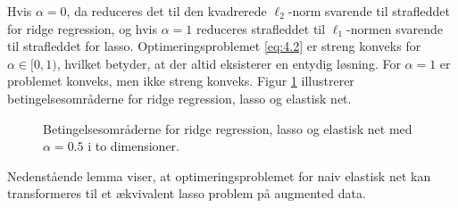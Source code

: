 Hvis $\alpha=0$, da reduceres det til den kvadrerede $\ell_2$-norm svarende til strafleddet for ridge regression, og hvis $\alpha=1$ reduceres strafleddet til $\ell_1$-normen svarende til strafleddet for lasso.
Optimeringsproblemet  \eqref{eq:4.2} er streng konveks for \(\alpha \in [0,1)\), hvilket betyder, at der altid eksisterer en entydig løsning.
For  \(\alpha=1\) er problemet konveks, men ikke streng konveks.
Figur \ref{fig:elastisk} illustrerer betingelsesområderne for ridge regression, lasso og elastisk net.
%
\begin{figure}[H]
\centering
\scalebox{0.8}{}
\caption{Betingelsesområderne for ridge regression, lasso og elastisk net med \(\alpha = 0.5\) i to dimensioner.} \label{fig:elastisk}
\end{figure}
%
%
%
%
Nedenstående lemma viser, at optimeringsproblemet for naiv elastisk net kan transformeres til et ækvivalent lasso problem på augmented data.
%
